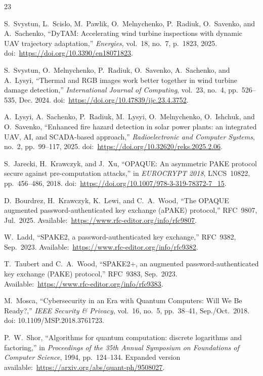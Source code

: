 \documentclass[conference]{IEEEtran}
\begin{document}
\begin{thebibliography}{23}

S.~Svystun, L.~Scislo, M.~Pawlik, O.~Melnychenko, P.~Radiuk, O.~Savenko, and A.~Sachenko, ``DyTAM: Accelerating wind turbine inspections with dynamic UAV trajectory adaptation,'' \emph{Energies}, vol.~18, no.~7, p.~1823, 2025. doi:~\url{https://doi.org/10.3390/en18071823}.

S.~Svystun, O.~Melnychenko, P.~Radiuk, O.~Savenko, A.~Sachenko, and A.~Lysyi, ``Thermal and RGB images work better together in wind turbine damage detection,'' \emph{International Journal of Computing}, vol.~23, no.~4, pp.~526--535, Dec. 2024. doi:~\url{https://doi.org/10.47839/ijc.23.4.3752}.

A.~Lysyi, A.~Sachenko, P.~Radiuk, M.~Lysyi, O.~Melnychenko, O.~Ishchuk, and O.~Savenko, ``Enhanced fire hazard detection in solar power plants: an integrated UAV, AI, and SCADA-based approach,'' \emph{Radioelectronic and Computer Systems}, no.~2, pp.~99--117, 2025. doi:~\url{https://doi.org/10.32620/reks.2025.2.06}.

S.~Jarecki, H.~Krawczyk, and J.~Xu, ``OPAQUE: An asymmetric PAKE protocol secure against pre-computation attacks,'' in \emph{EUROCRYPT 2018}, LNCS~10822, pp.~456--486, 2018. doi:~\url{https://doi.org/10.1007/978-3-319-78372-7_15}.

D.~Bourdrez, H.~Krawczyk, K.~Lewi, and C.~A.~Wood, ``The OPAQUE augmented password-authenticated key exchange (aPAKE) protocol,'' RFC~9807, Jul.~2025. Available:~\url{https://www.rfc-editor.org/info/rfc9807}.

W.~Ladd, ``SPAKE2, a password-authenticated key exchange,'' RFC~9382, Sep.~2023. Available:~\url{https://www.rfc-editor.org/info/rfc9382}.

T.~Taubert and C.~A.~Wood, ``SPAKE2+, an augmented password-authenticated key exchange (PAKE) protocol,'' RFC~9383, Sep.~2023. Available:~\url{https://www.rfc-editor.org/info/rfc9383}.

M.~Mosca, ``Cybersecurity in an Era with Quantum Computers: Will We Be Ready?,'' \emph{IEEE Security \& Privacy}, vol.~16, no.~5, pp.~38--41, Sep./Oct.~2018. doi: 10.1109/MSP.2018.3761723.

P.~W.~Shor, ``Algorithms for quantum computation: discrete logarithms and factoring,'' in \emph{Proceedings of the 35th Annual Symposium on Foundations of Computer Science}, 1994, pp.~124--134. Expanded version available:~\url{https://arxiv.org/abs/quant-ph/9508027}.


\end{thebibliography}
\end{document}
